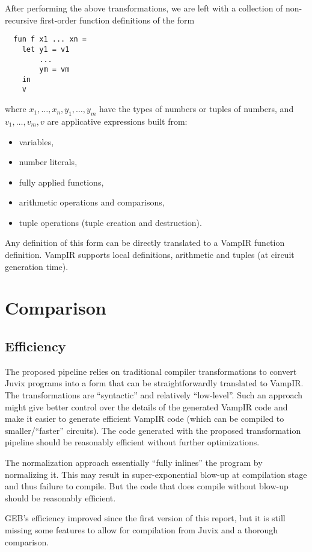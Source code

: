 After performing the above transformations, we are left with a
collection of non-recursive first-order function definitions of the
form
\begin{verbatim}
  fun f x1 ... xn =
    let y1 = v1
        ...
        ym = vm
    in
    v
\end{verbatim}
where $x_1,\ldots,x_n,y_1,\ldots,y_m$ have the types of numbers or
tuples of numbers, and $v_1,\ldots,v_m,v$ are applicative
expressions built from:
\begin{itemize}
\item variables,
\item number literals,
\item fully applied functions,
\item arithmetic operations and comparisons,
\item tuple operations (tuple creation and destruction).
\end{itemize}
Any definition of this form can be directly translated to a VampIR
function definition. VampIR supports local definitions, arithmetic and
tuples (at circuit generation time).

\section{Comparison}\label{sec_comparison}

\subsection{Efficiency}

The proposed pipeline relies on traditional compiler transformations
to convert Juvix programs into a form that can be straightforwardly
translated to VampIR. The transformations are ``syntactic'' and
relatively ``low-level''. Such an approach might give better control
over the details of the generated VampIR code and make it easier to
generate efficient VampIR code (which can be compiled to
smaller/``faster'' circuits). The code generated with the proposed
transformation pipeline should be reasonably efficient without further
optimizations.

The normalization approach essentially ``fully inlines'' the program
by normalizing it. This may result in super-exponential blow-up at
compilation stage and thus failure to compile. But the code that does
compile without blow-up should be reasonably efficient.

GEB's efficiency improved since the first version of this report, but
it is still missing some features to allow for compilation from Juvix
and a thorough comparison.

